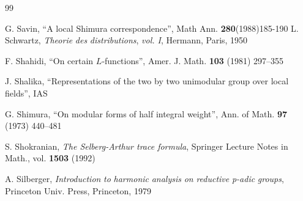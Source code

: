 \documentclass[12pt,letterpaper,openany]{book}
\theoremstyle{plain}
\theoremstyle{definition}
\theoremstyle{remark}
\theoremstyle{remark}
\begin{document}
\begin{thebibliography}{99}


 G. Savin, ``A local Shimura correspondence'',
Math Ann. \textbf{280}(1988)185-190
 L. Schwartz, \emph{Theorie} \emph{des}
\emph{distributions}, \emph{vol. I}, Hermann, Paris, 1950




 F. Shahidi, ``On certain $L$-functions'', Amer. J. Math.
\textbf{103} (1981) 297--355

 J. Shalika, ``Representations of the two by two
unimodular group over local fields'', IAS



 G. Shimura, ``On modular forms of half integral weight'',
Ann. of Math. \textbf{97} (1973) 440--481

 S. Shokranian, \emph{The Selberg-Arthur trace formula},
Springer Lecture Notes in Math., vol. \textbf{1503} (1992)

 A. Silberger, \emph{Introduction} \emph{to}
\emph{harmonic} \emph{analysis} \emph{on} \emph{reductive}
\emph{p-adic} \emph{groups}, Princeton Univ. Press, Princeton, 1979



\end{thebibliography}
\end{document}
